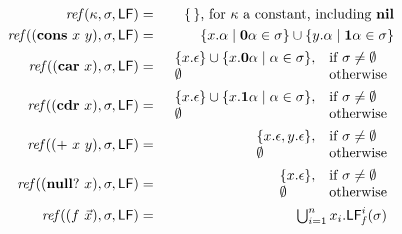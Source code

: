 \documentclass[9pt]{sigplanconf}
\def\myvec{\mathaccent"017E }
\begin{document}
\begin{figure}[t]
\begin{eqnarray*}
\mathit{ref\/}(\kappa,\sigma,\Lfonly)
          &=& \{\,\} \mbox{, for $\kappa$ a constant, including
$\NIL$}\\
\mathit{ref\/}((\CONS~x~y),\sigma,\Lfonly)
          &=& \{x.\alpha \mid \acar\alpha \in \sigma\} \cup \{y.\alpha
\mid \acdr\alpha \in \sigma\} \\
\mathit{ref\/}((\CAR~x),\sigma,\Lfonly)
          &=&    \begin{array}{l l}
                    \{x.\epsilon\} \cup \{x.\acar\alpha \mid \alpha \in
\sigma\}, & \mbox{if}~\sigma \ne \emptyset\\
                    \emptyset  & \mbox{otherwise}
                 \end{array} \\
\mathit{ref\/}((\CDR~x),\sigma,\Lfonly)
          &=&    \begin{array}{l l}
                    \{x.\epsilon\} \cup \{x.\acdr\alpha \mid \alpha \in
\sigma\}, & \mbox{if}~\sigma \ne \emptyset\\
                    \emptyset  & \mbox{otherwise}
                 \end{array} \\
\mathit{ref\/}((\PRIM~x~y),\sigma,\Lfonly)
          &=&    \begin{array}{l l}
                    \{x.\epsilon, y.\epsilon\},  & \mbox{if}~\sigma \ne
\emptyset\\
                    \emptyset  & \mbox{otherwise}
                 \end{array} \\
\mathit{ref\/}((\NULLQ~x),\sigma,\Lfonly)
          &=&    \begin{array}{l l}
                    \{x.\epsilon\},  & \mbox{if}~\sigma \ne \emptyset\\
                    \emptyset  & \mbox{otherwise}
                 \end{array} \\
\mathit{ref\/}((f~\myvec{x}),\sigma,\Lfonly)
          &=&  \begin{array}{@{}l}  %
               \bigcup_{i=1}^n x_i.\Lf{f}{i}{\sigma}
               \end{array}
\\[1ex]

\end{eqnarray*}
\end{figure}
\end{document}
